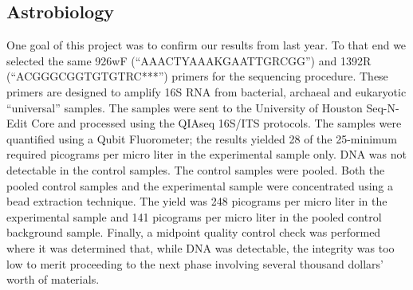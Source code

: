 \subsection{Astrobiology}
\label{sec:Astrobiology-Results}

One goal of this project was to confirm our results from last year. To that end we selected the same 926wF (“AAACTYAAAKGAATTGRCGG”) and 1392R (“ACGGGCGGTGTGTRC***”) primers for the sequencing procedure. These primers are designed to amplify 16S RNA from bacterial, archaeal and eukaryotic “universal” samples. The samples were sent to the University of Houston Seq-N-Edit Core and processed using the QIAseq 16S/ITS protocols. The samples were quantified using a Qubit Fluorometer; the results yielded 28 of the 25-minimum required picograms per micro liter in the experimental sample only. DNA was not detectable in the control samples. The control samples were pooled. Both the pooled control samples and the experimental sample were concentrated using a bead extraction technique. The yield was 248 picograms per micro liter in the experimental sample and 141 picograms per micro liter in the pooled control background sample. Finally, a midpoint quality control check was  performed where it was determined that, while DNA was detectable, the integrity was too low to merit proceeding to the next phase involving several thousand dollars’ worth of materials. 